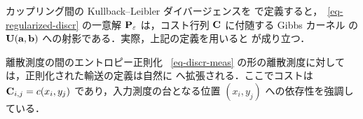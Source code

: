 カップリング間の Kullback--Leibler ダイバージェンスを
で定義すると，~\eqref{eq-regularized-discr} の一意解 $\P_\varepsilon$ は，コスト行列 $\C$ に付随する Gibbs カーネル
の $\CouplingsD(\a,\b)$ への射影である．実際，上記の定義を用いると
が成り立つ．




\begin{rem1}{離散測度の間のエントロピー正則化}\label{rem:entrop-reg}
~\eqref{eq-discr-meas} の形の離散測度に対しては，正則化された輸送の定義は自然に
\eql{\label{eq-entropic-disc-meas}
	\MK_\c^\varepsilon(\al,\be) \eqdef \MKD_\C^\varepsilon(\a,\b),
}
へ拡張される．ここでコストは $\C_{i,j}=\c(x_i,y_j)$ であり，入力測度の台となる位置 $(x_i,y_j)$ への依存性を強調している．
\end{rem1}


